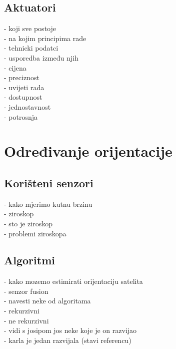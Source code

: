 \documentclass[times, utf8, diplomski, numeric]{templates/template}
\begin{document}
{{        \subsection{Aktuatori}{
            - koji sve postoje\\
            - na kojim principima rade\\
            - tehnicki podatci\\
            - usporedba između njih\\
                - cijena\\
                - preciznost\\
                - uvijeti rada\\
                - dostupnost\\
                - jednostavnost\\
                - potrosnja\\
        }
    }

    \section{Određivanje orijentacije}{
        \subsection{Korišteni senzori}{
            - kako mjerimo kutnu brzinu\\
                - ziroskop\\
                - sto je ziroskop\\
                - problemi ziroskopa\\
        }

        \subsection{Algoritmi}{
            - kako mozemo estimirati orijentaciju satelita\\
                - senzor fusion\\
                - navesti neke od algoritama\\
                - rekurzivni\\
                - ne rekurzivni\\
                - vidi s josipom jos neke koje je on razvijao\\
                - karla je jedan razvijala (stavi referencu)\\
        }
    }

}
\end{document}
